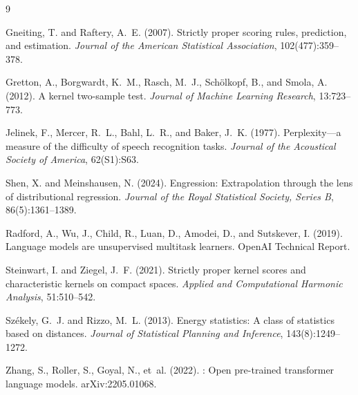 \documentclass{article}
\begin{document}
\begin{thebibliography}{9}
\footnotesize
\setlength{\bibsep}{3pt}

Gneiting, T. and Raftery, A.~E. (2007).
\newblock Strictly proper scoring rules, prediction, and estimation.
\newblock \emph{Journal of the American Statistical Association},
102(477):359--378.

Gretton, A., Borgwardt, K.~M., Rasch, M.~J., Sch\"olkopf, B., and Smola, A. (2012).
\newblock A kernel two-sample test.
\newblock \emph{Journal of Machine Learning Research}, 13:723--773.

Jelinek, F., Mercer, R.~L., Bahl, L.~R., and Baker, J.~K. (1977).
\newblock Perplexity---a measure of the difficulty of speech recognition tasks.
\newblock \emph{Journal of the Acoustical Society of America}, 62(S1):S63.

Shen, X. and Meinshausen, N. (2024).
\newblock Engression: Extrapolation through the lens of distributional regression.
\newblock \emph{Journal of the Royal Statistical Society, Series B}, 86(5):1361--1389.

Radford, A., Wu, J., Child, R., Luan, D., Amodei, D., and Sutskever, I. (2019).
\newblock Language models are unsupervised multitask learners.
\newblock OpenAI Technical Report.

Steinwart, I. and Ziegel, J.~F. (2021).
\newblock Strictly proper kernel scores and characteristic kernels on compact spaces.
\newblock \emph{Applied and Computational Harmonic Analysis}, 51:510--542.

Sz\'ekely, G.~J. and Rizzo, M.~L. (2013).
\newblock Energy statistics: A class of statistics based on distances.
\newblock \emph{Journal of Statistical Planning and Inference}, 143(8):1249--1272.

Zhang, S., Roller, S., Goyal, N., et~al. (2022).
: Open pre-trained transformer language models.
\newblock arXiv:2205.01068.

\end{thebibliography}

\appendix
\raggedbottom
\setlength{\intextsep}{6pt}
\renewcommand{\arraystretch}{0.92}
\end{document}
